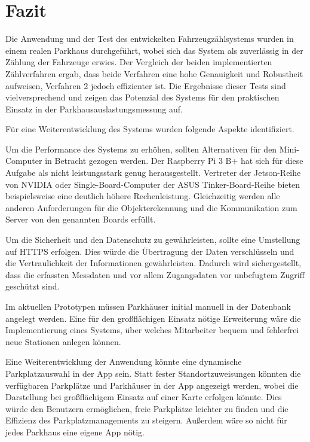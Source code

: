 \section{Fazit}\label{ch:Fazit}

Die Anwendung und der Test des entwickelten Fahrzeugzählsystems wurden in einem realen Parkhaus durchgeführt, wobei sich das System als zuverlässig in der Zählung der Fahrzeuge erwies.
Der Vergleich der beiden implementierten Zählverfahren ergab, dass beide Verfahren eine hohe Genauigkeit und Robustheit aufweisen, Verfahren 2 jedoch effizienter ist.
Die Ergebnisse dieser Tests sind vielversprechend und zeigen das Potenzial des Systems für den praktischen Einsatz in der Parkhausauslastungsmessung auf.

Für eine Weiterentwicklung des Systems wurden folgende Aspekte identifiziert.

Um die Performance des Systems zu erhöhen, sollten Alternativen für den Mini-Computer in Betracht gezogen werden.
Der Raspberry Pi 3 B+ hat sich für diese Aufgabe als nicht leistungsstark genug herausgestellt.
Vertreter der Jetson-Reihe von NVIDIA oder Single-Board-Computer der ASUS Tinker-Board-Reihe bieten beispielsweise eine deutlich höhere Rechenleistung.
Gleichzeitig werden alle anderen Anforderungen für die Objekterekennung und die Kommunikation zum Server von den genannten Boards erfüllt.

Um die Sicherheit und den Datenschutz zu gewährleisten, sollte eine Umstellung auf HTTPS erfolgen.
Dies würde die Übertragung der Daten verschlüsseln und die Vertraulichkeit der Informationen gewährleisten.
Dadurch wird sichergestellt, dass die erfassten Messdaten und vor allem Zugangsdaten vor unbefugtem Zugriff geschützt sind.

Im aktuellen Prototypen müssen Parkhäuser initial manuell in der Datenbank angelegt werden.
Eine für den großflächigen Einsatz nötige Erweiterung wäre die Implementierung eines Systems, über welches Mitarbeiter bequem und fehlerfrei neue Stationen anlegen können.

Eine Weiterentwicklung der Anwendung könnte eine dynamische Parkplatzauswahl in der App sein.
Statt fester Standortzuweisungen könnten die verfügbaren Parkplätze und Parkhäuser in der App angezeigt werden, wobei die Darstellung bei großflächigem Einsatz auf einer Karte erfolgen könnte.
Dies würde den Benutzern ermöglichen, freie Parkplätze leichter zu finden und die Effizienz des Parkplatzmanagements zu steigern.
Außerdem wäre so nicht für jedes Parkhaus eine eigene App nötig.

